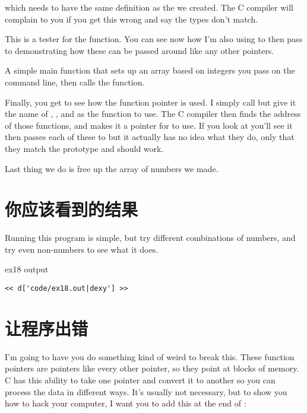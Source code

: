 \begin{description}
    which needs to have the same definition as the  we created.
    The C compiler will complain to you if you get this wrong and say the types don't
    match.
\item[ex18.c:74-87] This is a tester for the  function.  You can 
    see now how I'm also using  to then pass to 
    demonstrating how these can be passed around like any other pointers.
\item[ex18.c:90-103] A simple main function that sets up an array based on integers
    you pass on the command line, then calls the  function.
\item[ex18.c:105-107] Finally, you get to see how the  function
    pointer  is used.  I simply call  but
    give it the name of , , and 
     as the function to use.  The C compiler then finds
    the address of those functions, and makes it a pointer for 
     to use.  If you look at  you'll
    see it then passes each of these to  but it actually
    has no idea what they do, only that they match the  
    prototype and should work.
\item[ex18.c:109] Last thing we do is free up the array of numbers we made.
\end{description}


\section{你应该看到的结果}

Running this program is simple, but try different combinations of numbers, and
try even non-numbers to see what it does.

\begin{code}{ex18 output}
\begin{lstlisting}
<< d['code/ex18.out|dexy'] >>
\end{lstlisting}
\end{code}


\section{让程序出错}

I'm going to have you do something kind of weird to break this.  These function
pointers are pointers like every other pointer, so they point at blocks of
memory.  C has this ability to take one pointer and convert it to another so
you can process the data in different ways.  It's usually not necessary, but
to show you how to hack your computer, I want you to add this at the end of
:

